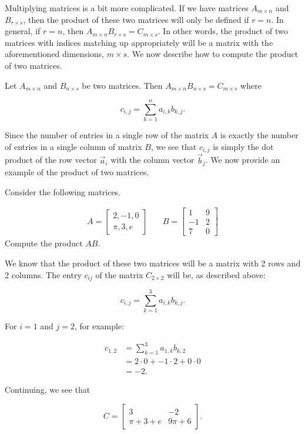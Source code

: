 Multiplying matrices is a bit more complicated.  If we have matrices $A_{m\times n}$ and $B_{r\times s}$, then the product of these two matrices will only be defined if $r=n$.  In general, if $r=n$, then $A_{m\times n}B_{r\times s} = C_{m\times s}$.  In other words, the product of two matrices with indices matching up appropriately will be a matrix with the aforementioned dimensions, $m\times s$.  We now describe how to compute the product of two matrices.

Let $A_{m\times n}$ and $B_{n\times s}$ be two matrices.   Then $A_{m\times n}B_{n\times s} = C_{m\times s}$ where 

\[c_{i,j} = \sum_{k=1}^n a_{i,k}b_{k,j}.\]

Since the number of entries in a single row of the matrix $A$ is exactly the number of entries in a single column of matrix $B$, we see that $c_{i,j}$ is simply the dot product of the row vector $\vec{a}_{i}$ with the column vector $\vec{b}_j$.  We now provide an example of the product of two matrices.\\

{
Consider the following matrices.

\begin{align}
	A = \begin{bmatrix}
		2, -1, 0\\
		\pi, 3, e
	\end{bmatrix}
	&\quad B = \begin{bmatrix}
		1 & 9 \\
		-1 & 2\\
		7 & 0		
	\end{bmatrix}
\end{align}
Compute the product $AB$.
}
{
We know that the product of these two matrices will be a matrix with 2 rows and 2 columns.  The entry $c_{ij}$ of the matrix $C_{2\times 2}$ will be, as described above:

\[c_{i,j} = \sum_{k=1}^3 a_{i,k}b_{k,j}.\]

For $i=1$ and $j=2$, for example:

\begin{align}
c_{1,2} &= \sum_{k=1}^3 a_{1,k}b_{k, 2}\\	
			 &= 2\cdot 0+ -1\cdot 2+0\cdot 0 \\
			 &= -2.
\end{align}

Continuing, we see that

\[C=
\begin{bmatrix}
	3 & -2\\
	\pi + 3 +e &9\pi+6
\end{bmatrix}.
\]
}\\

